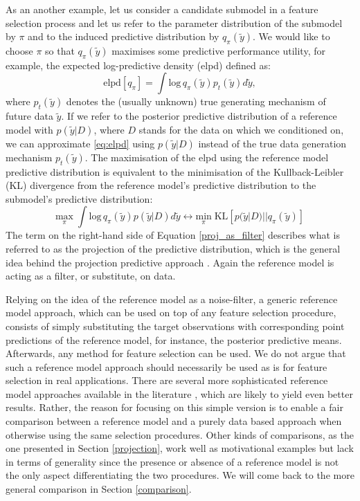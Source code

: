 \documentclass[american,]{article}
\theoremstyle{definition}
\begin{document}
As an another example, let us consider a candidate submodel in a
feature selection process and let us refer to the parameter
distribution of the submodel by $\pi$ and to the induced predictive
distribution by $q_{\pi}(\tilde{y})$. We would like to choose $\pi$ so
that $q_{\pi}(\tilde{y})$ maximises some predictive performance
utility, for example, the expected log-predictive density (elpd)
defined as: \
\begin{equation}\label{eq:elpd}
\text{elpd}[q_{\pi}]=\int \text{log}\,q_{\pi}(\tilde{y})p_{t}(\tilde{y})d\tilde{y},
\end{equation}
where $p_{t}(\tilde{y})$ denotes the (usually unknown) true generating
mechanism of future data $\tilde{y}$. If we refer to the posterior
predictive distribution of a reference model with $p(\tilde{y}|D)$,
where $D$ stands for the data on which we conditioned on, we can
approximate \eqref{eq:elpd} using $p(\tilde{y}|D)$ instead of the true
data generation mechanism $p_{t}(\tilde{y})$. The maximisation of the
elpd using the reference model predictive distribution is equivalent
to the minimisation of the Kullback-Leibler (KL) divergence from the
reference model's predictive distribution to the submodel's predictive
distribution: \
\begin{equation} \label{proj_as_filter}
\underset{\pi}{\text{max}} \; \int \text{log}\,q_{\pi}(\tilde{y})p(\tilde{y}|D)d\tilde{y} \leftrightarrow \underset{\pi}{\text{min}} \; \text{KL}[p(\tilde{y}|D)||q_{\pi}(\tilde{y})] 
\end{equation}
The term on the right-hand side of Equation \eqref{proj_as_filter}
describes what is referred to as the projection of the predictive
distribution, which is the general idea behind the projection
predictive approach \cite[see][]{paper:projpred}. Again the reference
model is acting as a filter, or substitute, on data.


Relying on the idea of the reference model as a noise-filter, a
generic reference model approach, which can be used on top of any
feature selection procedure, consists of simply substituting the
target observations with corresponding point predictions of the
reference model, for instance, the posterior predictive
means. Afterwards, any method for feature selection can be used. We do
not argue that such a reference model approach should necessarily be
used as is for feature selection in real applications. There are
several more sophisticated reference model approaches available in the
literature \cite[see,
e.g.][]{paper:projpred,paananen2017variable,paul2008preconditioning},
which are likely to yield even better results. Rather, the reason for
focusing on this simple version is to enable a fair comparison between
a reference model and a purely data based approach when otherwise
using the same selection procedures. Other kinds of comparisons, as
the one presented in Section \ref{projection}, work well as
motivational examples but lack in terms of generality since the
presence or absence of a reference model is not the only aspect
differentiating the two procedures. We will come back to the more
general comparison in Section \ref{comparison}.
\end{document}
